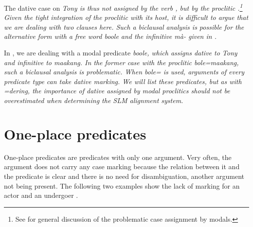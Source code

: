 The dative case on \em Tony \em is thus not assigned by the verb , but by the proclitic .\footnote{See \citet[128]{Noonan1985} for general discussion of the problematic case assignment by modals.} Given the tight integration of the proclitic with its host, it is difficult to argue that we are dealing with two clauses here. Such a biclausal analysis is possible for the alternative form with a free word \em boole \em and the infinitive \em mà- \em given in .



In , we are dealing with a modal predicate \em boole\em, which assigns dative to \em Tony \em and infinitive to \em maakang\em. In the former case with the proclitic \em bole=maakang\em, such a biclausal analysis is problematic. When \em bole= \em is used, arguments of every predicate type can take dative marking. We will list these predicates, but as with \em =dering\em, the importance of dative assigned by modal proclitics should not be overestimated when determining the SLM alignment system.



\section{One-place predicates}\label{sec:argstr:One-placepredicates}
One-place predicates are predicates with only one argument. Very often, the argument does not carry any case marking because the relation between it and the predicate is clear and there is no need for disambiguation, another argument not being present.  The following two examples show the lack of marking for an actor  and an undergoer .
 


